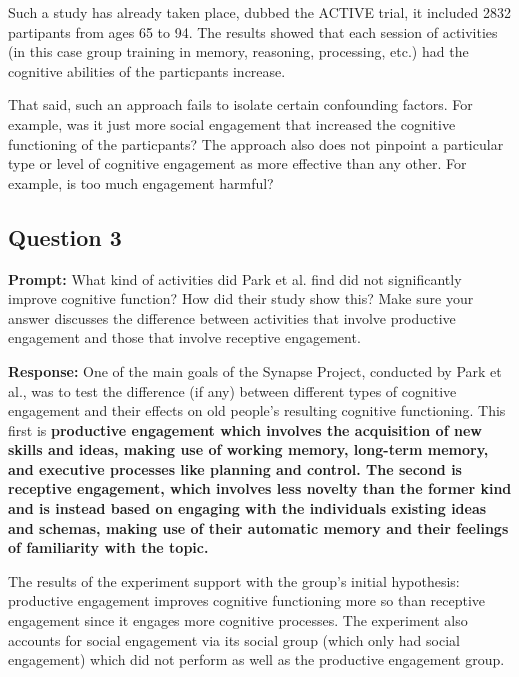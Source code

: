 \documentclass{article}
\begin{document}
Such a study has already taken place, dubbed the ACTIVE trial, it included 2832 partipants from ages 65 to 94. The results showed that each session of activities (in this case group training in memory, reasoning, processing, etc.) had the cognitive abilities of the particpants increase.

That said, such an approach fails to isolate certain confounding factors. For example, was it just more social engagement that increased the cognitive functioning of the particpants? The approach also does not pinpoint a particular type or level of cognitive engagement as more effective than any other. For example, is too much engagement harmful?

\subsection*{Question 3}
\noindent\textbf{Prompt:} What kind of activities did Park et al. find did not significantly improve cognitive function? How did their study show this? Make sure your answer discusses the difference between activities that involve productive engagement and those that involve receptive engagement.
\bigskip

\noindent\textbf{Response:} One of the main goals of the Synapse Project, conducted by Park et al., was to test the difference (if any) between different types of cognitive engagement and their effects on old people's resulting cognitive functioning. This first is \bf productive engagement \normalfont which involves the acquisition of new skills and ideas, making use of working memory, long-term memory, and executive processes like planning and control. The second is \bf receptive engagement\normalfont, which involves less novelty than the former kind and is instead based on engaging with the individuals existing ideas and schemas, making use of their automatic memory and their feelings of familiarity with the topic.

The results of the experiment support with the group's initial hypothesis: productive engagement improves cognitive functioning more so than receptive engagement since it engages more cognitive processes. The experiment also accounts for social engagement via its social group (which only had social engagement) which did not perform as well as the productive engagement group.
\end{document}

